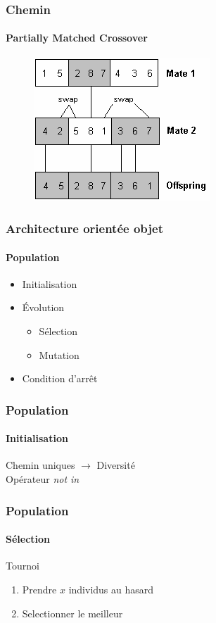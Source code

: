 \documentclass{beamer}
\begin{document}
\begin{frame}
  \frametitle{Chemin}
  \framesubtitle{Partially Matched Crossover}
  \begin{figure}
    \includegraphics[scale=0.9]{pmx.png}
    \end{figure}
\end{frame}

\begin{frame}
  \frametitle{Architecture orientée objet}
  \framesubtitle{\textbf{Population}}
  \begin{itemize}
    \item Initialisation
    \item Évolution
      \begin{itemize}
        \item Sélection
        \item Mutation
      \end{itemize}
    \item Condition d'arrêt
  \end{itemize}
\end{frame}

\begin{frame}
  \frametitle{Population}
  \framesubtitle{Initialisation}
  Chemin uniques $\rightarrow$ Diversité \\
  Opérateur \emph{not in}
\end{frame}

\begin{frame}
  \frametitle{Population}
  \framesubtitle{Sélection}
  Tournoi
  \begin{enumerate}
    \item Prendre $x$ individus au hasard
    \item Selectionner le meilleur 
  \end{enumerate}
\end{frame}
\end{document}
